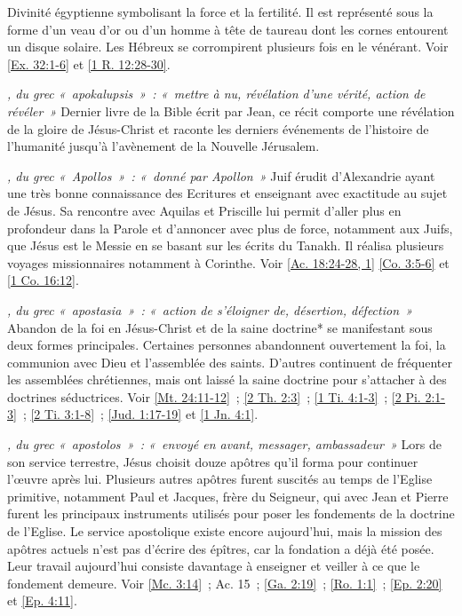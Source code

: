 \begin{multicols}{2}
\textit{}\newline
Divinité égyptienne symbolisant la force et la fertilité. Il est représenté sous la forme d'un veau d'or ou d'un homme à tête de taureau dont les cornes entourent un disque solaire. Les Hébreux se corrompirent plusieurs fois en le vénérant. Voir \vref{Ex. 32:1-6} et \vref{1 R. 12:28-30}.

\textit{, du grec «~apokalupsis~»~: «~mettre à nu, révélation d'une vérité, action de révéler~»}\newline
Dernier livre de la Bible écrit par Jean, ce récit comporte une révélation de la gloire de Jésus-Christ et raconte les derniers événements de l'histoire de l'humanité jusqu'à l'avènement de la Nouvelle Jérusalem.

\textit{, du grec «~Apollos~»~: «~donné par Apollon~»}\newline
Juif érudit d'Alexandrie ayant une très bonne connaissance des Ecritures et enseignant avec exactitude au sujet de Jésus. Sa rencontre avec Aquilas et Priscille lui permit d'aller plus en profondeur dans la Parole et d'annoncer avec plus de force, notamment aux Juifs, que Jésus est le Messie en se basant sur les écrits du Tanakh. Il réalisa plusieurs voyages missionnaires notamment à Corinthe.\newline
Voir \vref{Ac. 18:24-28, 1} \vref{Co. 3:5-6} et \vref{1 Co. 16:12}.

\textit{, du grec «~apostasia~»~: «~action de s'éloigner de, désertion, défection~»}\newline
Abandon de la foi en Jésus-Christ et de la saine doctrine* se manifestant sous deux formes principales. Certaines personnes abandonnent ouvertement la foi, la communion avec Dieu et l'assemblée des saints. D'autres continuent de fréquenter les assemblées chrétiennes, mais ont laissé la saine doctrine pour s'attacher à des doctrines séductrices.\newline
Voir \vref{Mt. 24:11-12}~; \vref{2 Th. 2:3}~; \vref{1 Ti. 4:1-3}~; \vref{2 Pi. 2:1-3}~; \vref{2 Ti. 3:1-8}~; \vref{Jud. 1:17-19} et \vref{1 Jn. 4:1}.

\textit{, du grec «~apostolos~»~: «~envoyé en avant, messager, ambassadeur~»}\newline
Lors de son service terrestre, Jésus choisit douze apôtres qu'il forma pour continuer l'œuvre après lui. Plusieurs autres apôtres furent suscités au temps de l'Eglise primitive, notamment Paul et Jacques, frère du Seigneur, qui avec Jean et Pierre furent les principaux instruments utilisés pour poser les fondements de la doctrine de l'Eglise. Le service apostolique existe encore aujourd'hui, mais la mission des apôtres actuels n'est pas d'écrire des épîtres, car la fondation a déjà été posée. Leur travail aujourd'hui consiste davantage à enseigner et veiller à ce que le fondement demeure.\newline
Voir \vref{Mc. 3:14}~; Ac. 15~; \vref{Ga. 2:19}~; \vref{Ro. 1:1}~; \vref{Ep. 2:20} et \vref{Ep. 4:11}.


\end{multicols}
